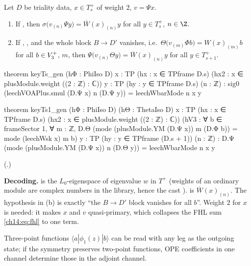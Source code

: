 \begin{theorem}\label{ch14:thm:keyTs}
Let $D$ be triality data, $x\in T_s^+$ of weight $2$, $v=\Psi x$.
\begin{enumerate}[label=(\alph*)]
\item If , then $\sigma\bigl(v_{(n)}\Psi y\bigr)=\overline W(x)_{(n)}y$ for all
  $y\in T_s^+$, $n\in\Z$.
\item If , , and the whole block $B\to D'$ vanishes, i.e.\
  $\Theta\bigl(v_{(m)}\Phi b\bigr)=W(x)_{(m)}b$ for all $b\in V_3^{+}$, $m$, then
  $\Psi\bigl(v_{(n)}\Theta y\bigr)=\overline W(x)_{(n)}y$ for all $y\in T_{s+1}^+$.
\end{enumerate}
\end{theorem}
\begin{leancode}
theorem keyTs_gen (hΦ : PhiIso D) {x : TP} (hx : x ∈ TPframe D.s)
    (hx2 : x ∈ plusModule.weight ((2 : ℤ) : ℂ)) {y : TP} (hy : y ∈ TPframe D.s) (n : ℤ) :
    sig0 (leechVOAPlus.smul (D.Ψ x) n (D.Ψ y)) = leechWbarMode n x y

theorem keyTs1_gen (hΦ : PhiIso D) (hΘ : ThetaIso D) {x : TP} (hx : x ∈ TPframe D.s)
    (hx2 : x ∈ plusModule.weight ((2 : ℤ) : ℂ))
    (hV3 : ∀ b ∈ frameSector 1, ∀ m : ℤ,
      D.Θ (mode (plusModule.YM (D.Ψ x)) m (D.Φ b)) = mode (leechWsk x) m b)
    {y : TP} (hy : y ∈ TPframe (D.s + 1)) (n : ℤ) :
    D.Ψ (mode (plusModule.YM (D.Ψ x)) n (D.Θ y)) = leechWbarMode n x y
\end{leancode}
(.)

\begin{dictionary}
\textbf{Decoding.}   is the $L_0$-eigenspace of eigenvalue $w$ in $T^+$
(weights of an ordinary module are complex numbers in the library, hence the cast
\lean{((2 : ℤ) : ℂ)}).  \lean{leechWbarMode n x} is $\overline W(x)_{(n)}$.  The hypothesis 
in (b) is exactly ``the $B\to D'$ block vanishes for all $b$''.  Weight $2$ for $x$ is needed: it makes
$x$ and $v$ quasi-primary, which collapses the FHL sum \eqref{ch14:eq:fhl} to one term.
\end{dictionary}
\begin{physics}
Three-point functions $\langle a|\phi_1(z)|b\rangle$ can be read with any leg as the outgoing state; if the symmetry preserves two-point functions, OPE coefficients in one channel determine those in the adjoint channel.
\end{physics}


